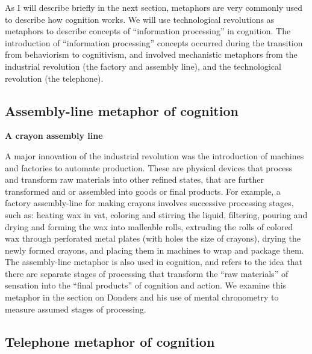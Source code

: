 \documentclass[
  oneside,
  12pt]{crumpbook}
\newenvironment{floatright50}{%
  \wrapfigure{R}{.5\textwidth}%
  }{%
  \endwrapfigure}
\begin{document}
As I will describe briefly in the next section, metaphors are very commonly used to describe how cognition works. We will use technological revolutions as metaphors to describe concepts of ``information processing'' in cognition. The introduction of ``information processing'' concepts occurred during the transition from behaviorism to cognitivism, and involved mechanistic metaphors from the industrial revolution (the factory and assembly line), and the technological revolution (the telephone).

\hypertarget{assembly-line-metaphor-of-cognition}{%
\subsection{Assembly-line metaphor of cognition}\label{assembly-line-metaphor-of-cognition}}

\begin{floatright50}
\textbf{A crayon assembly line}

\end{floatright50}

A major innovation of the industrial revolution was the introduction of machines and factories to automate production. These are physical devices that process and transform raw materials into other refined states, that are further transformed and or assembled into goods or final products. For example, a factory assembly-line for making crayons involves successive processing stages, such as: heating wax in vat, coloring and stirring the liquid, filtering, pouring and drying and forming the wax into malleable rolls, extruding the rolls of colored wax through perforated metal plates (with holes the size of crayons), drying the newly formed crayons, and placing them in machines to wrap and package them. The assembly-line metaphor is also used in cognition, and refers to the idea that there are separate stages of processing that transform the ``raw materials'' of sensation into the ``final products'' of cognition and action. We examine this metaphor in the section on Donders and his use of mental chronometry to measure assumed stages of processing.

\hypertarget{telephone-metaphor-of-cognition}{%
\subsection{Telephone metaphor of cognition}\label{telephone-metaphor-of-cognition}}
\end{document}

